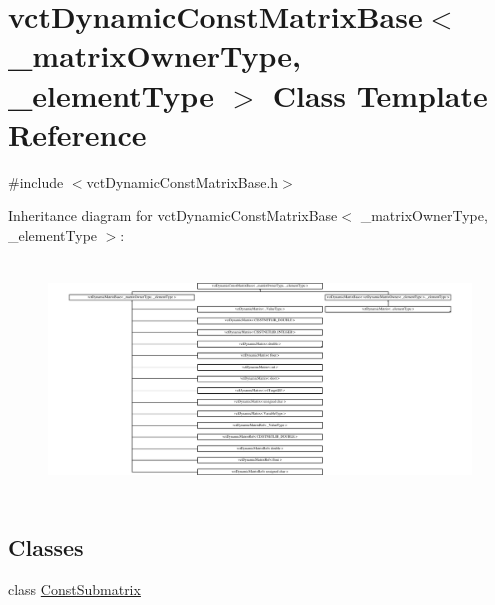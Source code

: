 \hypertarget{classvct_dynamic_const_matrix_base}{\section{vct\-Dynamic\-Const\-Matrix\-Base$<$ \-\_\-matrix\-Owner\-Type, \-\_\-element\-Type $>$ Class Template Reference}
\label{classvct_dynamic_const_matrix_base}
}


{\ttfamily \#include $<$vct\-Dynamic\-Const\-Matrix\-Base.\-h$>$}

Inheritance diagram for vct\-Dynamic\-Const\-Matrix\-Base$<$ \-\_\-matrix\-Owner\-Type, \-\_\-element\-Type $>$\-:\begin{figure}[H]
\begin{center}
\leavevmode
\includegraphics[height=6.333999cm]{d5/d32/classvct_dynamic_const_matrix_base}
\end{center}
\end{figure}
\subsection*{Classes}
\begin{DoxyCompactItemize}
\item 
class \hyperlink{classvct_dynamic_const_matrix_base_1_1_const_submatrix}{Const\-Submatrix}
\end{DoxyCompactItemize}
